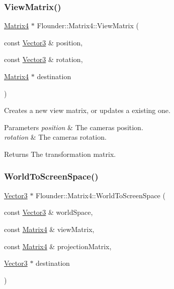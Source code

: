 \subsubsection{\texorpdfstring{View\+Matrix()}{ViewMatrix()}}
{\footnotesize\ttfamily \hyperlink{class_flounder_1_1_matrix4}{Matrix4} $\ast$ Flounder\+::\+Matrix4\+::\+View\+Matrix (\begin{DoxyParamCaption}\item[{const \hyperlink{class_flounder_1_1_vector3}{Vector3} \&}]{position,  }\item[{const \hyperlink{class_flounder_1_1_vector3}{Vector3} \&}]{rotation,  }\item[{\hyperlink{class_flounder_1_1_matrix4}{Matrix4} $\ast$}]{destination }\end{DoxyParamCaption})\hspace{0.3cm}{\ttfamily [static]}}



Creates a new view matrix, or updates a existing one. 


\begin{DoxyParams}{Parameters}
{\em position} & The cameras position. \\
\hline
{\em rotation} & The cameras rotation. \\
\hline
\end{DoxyParams}
\begin{DoxyReturn}{Returns}
The transformation matrix. 
\end{DoxyReturn}
\mbox{\label{class_flounder_1_1_matrix4_af8f9dcdd5e99ba3dc19d94ba4759c028}} 
\subsubsection{\texorpdfstring{World\+To\+Screen\+Space()}{WorldToScreenSpace()}}
{\footnotesize\ttfamily \hyperlink{class_flounder_1_1_vector3}{Vector3} $\ast$ Flounder\+::\+Matrix4\+::\+World\+To\+Screen\+Space (\begin{DoxyParamCaption}\item[{const \hyperlink{class_flounder_1_1_vector3}{Vector3} \&}]{world\+Space,  }\item[{const \hyperlink{class_flounder_1_1_matrix4}{Matrix4} \&}]{view\+Matrix,  }\item[{const \hyperlink{class_flounder_1_1_matrix4}{Matrix4} \&}]{projection\+Matrix,  }\item[{\hyperlink{class_flounder_1_1_vector3}{Vector3} $\ast$}]{destination }\end{DoxyParamCaption})\hspace{0.3cm}{\ttfamily [static]}}



